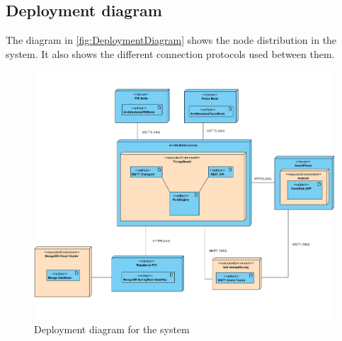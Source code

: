 \clearpage
\subsection{Deployment diagram}

The diagram in \autoref{fig:DeploymentDiagram} shows the node distribution in the system. It also shows the 
different connection protocols used between them.

\begin{figure}[H]
    \centering
    \includegraphics[width=1\textwidth]{./images/6/Deployment.png}
    \caption{Deployment diagram for the system}
    \label{fig:DeploymentDiagram}
\end{figure}
